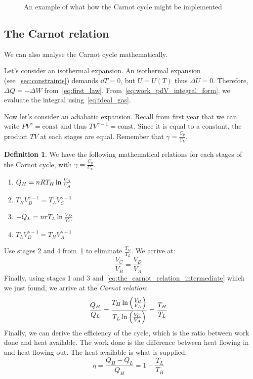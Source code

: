 \documentclass[12pt,chapterprefix=false,dvipsnames]{scrbook}
\theoremstyle{dotless}
\theoremstyle{definition}
\newtheorem{protodefinition}{Definition}[section]
\newenvironment{definition}
{\colorlet{shadecolor}{black!15}\begin{shaded}\begin{protodefinition}}
			{\end{protodefinition}\end{shaded}}
\begin{document}
\begin{figure}[htpb]
	\centering
	
	\caption{An example of what how the Carnot cycle might be implemented}%
	\label{fig:carnot_cycle_example}
\end{figure}

\subsection{The Carnot relation}%
\label{sub:the_carnot_relation}

We can also analyse the Carnot cycle mathematically.

Let's consider an isothermal expansion. An isothermal expansion
(see~\ref{sec:constraints}) demands $\dd{T} = 0$,
but $U = U(T)$ thus $\Delta U = 0$.
Therefore, $\Delta Q = -\Delta W$ from~\ref{eq:first_law}.
From~\ref{eq:work_pdV_integral_form}, we evaluate the integral
using~\ref{eq:ideal_gas}.

Now let's consider an adiabatic expansion. Recall from first
year that we can write $PV^\gamma = \mathrm{const}$ and thus
$TV^{\gamma - 1} = \mathrm{const}$. Since it is equal to a constant, the
product $TV$ at each stages are equal.
Remember that $\gamma = \frac{C_p}{C_V}$.

\begin{definition}%
	\label{eq:carnot_stages}
	We have the following mathematical relations for each stages of
	the Carnot cycle, with $\gamma = \frac{C_p}{C_V}$.
	\begin{enumerate}
		\item $Q_H = nRT_H\naturallogarithm\frac{V_B}{V_A}$
		\item $T_H V_B^{\gamma - 1} = T_L V_C^{\gamma - 1}$
		\item $-Q_L = nrT_L\naturallogarithm\frac{V_D}{V_C}$
		\item $T_L V_D^{\gamma - 1} = T_H V_A^{\gamma - 1}$
	\end{enumerate}
	Use stages 2 and 4 from~\ref{eq:carnot_stages} to eliminate
	$\frac{T_H}{T_L}$. We arrive at:
	\begin{equation}
		\label{eq:the_carnot_relation_intermediate}
		\frac{V_C}{V_B}
		=
		\frac{V_D}{V_A}
	\end{equation}
	Finally, using stages 1 and 3 and~\ref{eq:the_carnot_relation_intermediate} which
	we just found, we arrive at the \textit{Carnot relation}:
	\begin{equation}
		\frac{Q_H}{Q_L}
		=
		\frac{T_H\naturallogarithm\left(\frac{V_B}{V_A}\right)}{T_L\naturallogarithm\left(\frac{V_C}{V_A}\right)}
		=
		\frac{T_H}{T_L}
	\end{equation}
	Finally, we can derive the efficiency of the cycle, which is the
	ratio between work done and heat available. The work done is the
	difference between heat flowing in and heat flowing out. The
	heat available is what is supplied.
	\begin{equation}
		\label{eq:carnot_efficiency}
		\eta = \frac{Q_H - Q_L}{Q_H} = 1 - \frac{T_L}{T_H}
	\end{equation}
\end{definition}
\end{document}
